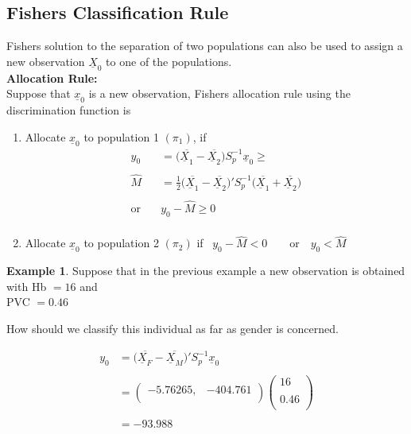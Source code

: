 \documentclass[11pt,a4paper]{article}
\theoremstyle{definition}
\newtheorem{exa}[thm]{Example}
\begin{document}
\pagebreak
\subsection{Fishers Classification Rule}
Fishers solution to the separation of two populations can also be used to assign a new observation $\underline{X}_0$ to one of the populations.\\

\textbf{Allocation Rule:}\\
Suppose that $\underline{x}_0$ is a new observation, Fishers allocation rule using the discrimination function is 
\begin{enumerate}
\item Allocate $\underline{x}_0$ to population 1 $(\pi_1)$, if
\begin{align*}
y_0 & = \big(\overline{\underline{X}_1}-\overline{\underline{X}_2}\big) S^{-1}_p\underline{x}_0\geq \\\\
\widehat{M} & = \frac{1}{2}\big(\overline{\underline{X}_1}-\overline{\underline{X}_2}\big)'S^{-1}_p\big(\overline{\underline{X}_1}+ \overline{\underline{X}_2}\big)\\\\
\text{or}\quad  & y_0-\widehat{M}\geq 0\\
\end{align*}



\item Allocate $\underline{x}_0$ to population 2 $(\pi_2)$ if \,
$y_0 - \widehat{M} <0\qquad \text{or}\quad  y_0<\widehat{M}$\\

\end{enumerate}





\begin{exa}
Suppose that in the previous example a new observation is obtained with Hb $= 16$ and\\ PVC $=0.46$\\
\end{exa}

How should we  classify this individual as far as gender is concerned.



\begin{align*}
y_0 & =\big(\overline{\underline{X}_F} - \overline{\underline{X}_M}\big)'S^{-1}_p\underline{x}_0\\\\
& = \begin{pmatrix}
-5.76265, & -404.761\\
\end{pmatrix}
\begin{pmatrix}
16\\
\\
0.46\\
\end{pmatrix}\\\\
& = -93.988
\end{align*}
\end{document}
